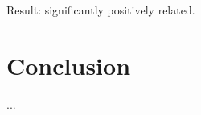 \documentclass[mnsc]{informs3}
\begin{document}
Result: significantly positively related. 

\section{Conclusion}

...

%
%
%
\end{document}
